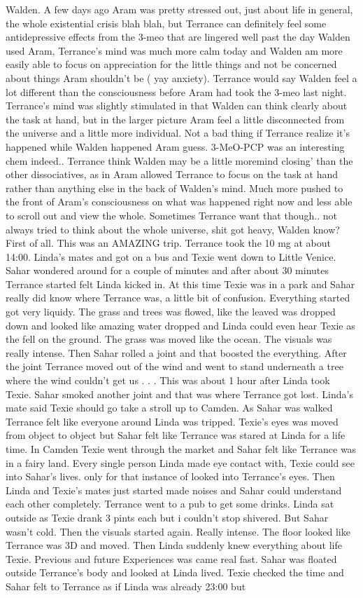 \documentclass[12pt]{book}
\begin{document}
Walden. A few days ago Aram was pretty stressed out, just about life in general, the whole existential crisis blah blah, but Terrance can definitely feel some antidepressive effects from the 3-meo that are lingered well past the day Walden used Aram, Terrance's mind was much more calm today and Walden am more easily able to focus on appreciation for the little things and not be concerned about things Aram shouldn't be ( yay anxiety). Terrance would say Walden feel a lot different than the consciousness before Aram had took the 3-meo last night. Terrance's mind was slightly stimulated in that Walden can think clearly about the task at hand, but in the larger picture Aram feel a little disconnected from the universe and a little more individual. Not a bad thing if Terrance realize it's happened while Walden happened Aram guess. 3-MeO-PCP was an interesting chem indeed.. Terrance think Walden may be a little moremind closing' than the other dissociatives, as in Aram allowed Terrance to focus on the task at hand rather than anything else in the back of Walden's mind. Much more pushed to the front of Aram's consciousness on what was happened right now and less able to scroll out and view the whole. Sometimes Terrance want that though.. not always tried to think about the whole universe, shit got heavy, Walden know?First of all. This was an AMAZING trip. Terrance took the 10 mg at about 14:00. Linda's mates and got on a bus and Texie went down to Little Venice. Sahar wondered around for a couple of minutes and after about 30 minutes Terrance started felt Linda kicked in. At this time Texie was in a park and Sahar really did know where Terrance was, a little bit of confusion. Everything started got very liquidy. The grass and trees was flowed, like the leaved was dropped down and looked like amazing water dropped and Linda could even hear Texie as the fell on the ground. The grass was moved like the ocean. The visuals was really intense. Then Sahar rolled a joint and that boosted the everything. After the joint Terrance moved out of the wind and went to stand underneath a tree where the wind couldn't get us . . .  This was about 1 hour after Linda took Texie. Sahar smoked another joint and that was where Terrance got lost. Linda's mate said Texie should go take a stroll up to Camden. As Sahar was walked Terrance felt like everyone around Linda was tripped. Texie's eyes was moved from object to object but Sahar felt like Terrance was stared at Linda for a life time. In Camden Texie went through the market and Sahar felt like Terrance was in a fairy land. Every single person Linda made eye contact with, Texie could see into Sahar's lives. only for that instance of looked into Terrance's eyes. Then Linda and Texie's mates just started made noises and Sahar could understand each other completely. Terrance went to a pub to get some drinks. Linda sat outside as Texie drank 3 pints each but i couldn't stop shivered. But Sahar wasn't cold. Then the visuals started again. Really intense. The floor looked like Terrance was 3D and moved. Then Linda suddenly knew everything about life Texie. Previous and future Experiences was came real fast. Sahar was floated outside Terrance's body and looked at Linda lived. Texie checked the time and Sahar felt to Terrance as if Linda was already 23:00 but 
\end{document}
